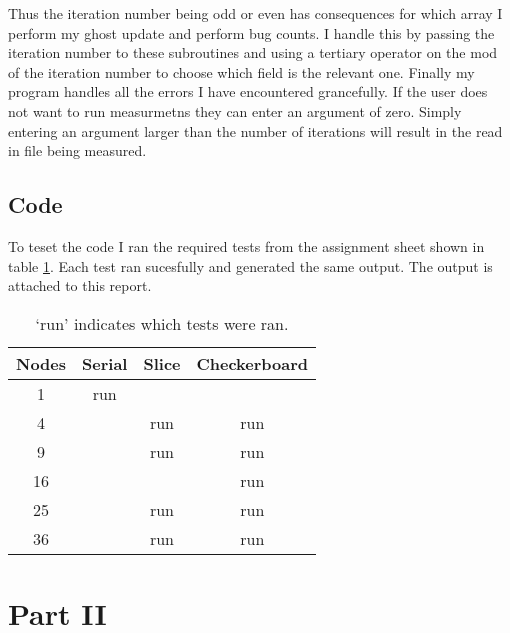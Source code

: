 \documentclass[11pt,a4paper,oneside]{report}
\begin{document}
Thus the iteration number being odd or even has consequences for which array I perform my ghost update and perform bug counts.  
I handle this by passing the iteration number to these subroutines and using a tertiary operator on the mod of the iteration number to choose which field is the relevant one.
Finally my program handles all the errors I have encountered grancefully.
If the user does not want to run measurmetns they can enter an argument of zero.
Simply entering an argument larger than the number of iterations will result in the read in file being measured.

\subsection{Code}
To teset the code I ran the required tests from the assignment sheet shown in table \ref{runs}.
Each test ran sucesfully and generated the same output.  
The output is attached to this report.
\begin{table}
  \centering
  \begin{tabular}{|c|c|c|c|}
    \hline
    Nodes & Serial & Slice & Checkerboard \\
    \hline
        1 & run & & \\
        4 & & run & run \\
        9 & & run & run \\
       16 & & & run \\
       25 & & run & run \\
       36 & & run & run \\
    \hline
  \end{tabular}
  \caption{`run' indicates which tests were ran.}
  \label{runs}
\end{table}

\section{Part II}
\end{document}
